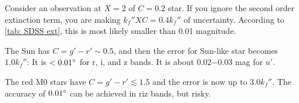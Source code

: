 


\begin{ex}
Consider an observation at $ X = 2 $ of $ C = 0.2 $ star. If you ignore the second order extinction term, you are making $ k_f'' XC = 0.4 k_f'' $ of uncertainty. According to \cref{tab: SDSS ext}, this is most likely smaller than 0.01 magnitude. 

The Sun has $ C = g' - r' \sim 0.5 $, and then the error for Sun-like star becomes $ 1.0 k_f'' $: It is $ < \m{0.01} $ for r, i, and z bands. It is about $ 0.02\mathrm{-}0.03 $ mag for $ u' $.

The red M0 stars have $ C = g' - r' \lesssim 1.5 $ and the error is now up to $ 3.0 k_f'' $. The accuracy of $ \m{0.01} $ can be achieved in riz bands, but risky.
\end{ex}

